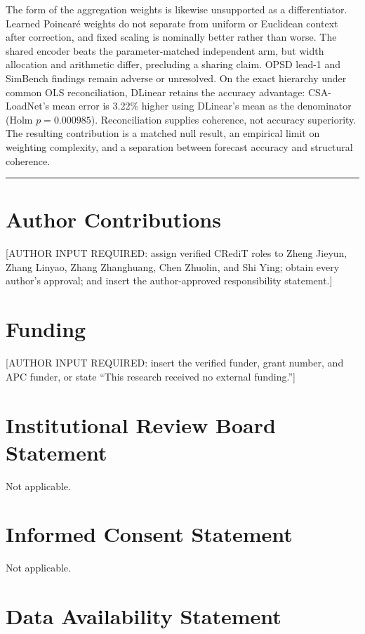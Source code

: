 \documentclass[electronics,article,submit,moreauthors]{Definitions/mdpi}
\begin{document}
The form of the aggregation weights is likewise unsupported as a differentiator. Learned Poincar\'{e} weights do not separate from uniform or Euclidean context after correction, and fixed scaling is nominally better rather than worse. The shared encoder beats the parameter-matched independent arm, but width allocation and arithmetic differ, precluding a sharing claim. OPSD lead-1 and SimBench findings remain adverse or unresolved. On the exact hierarchy under common OLS reconciliation, DLinear retains the accuracy advantage: CSA-LoadNet's mean error is 3.22\% higher using DLinear's mean as the denominator (Holm \(p=0.000985\)). Reconciliation supplies coherence, not accuracy superiority. The resulting contribution is a matched null result, an empirical limit on weighting complexity, and a separation between forecast accuracy and structural coherence.

\begin{center}\rule{0.5\linewidth}{0.5pt}\end{center}

\section*{Author Contributions}

{[}AUTHOR INPUT REQUIRED: assign verified CRediT roles to Zheng Jieyun, Zhang Linyao, Zhang Zhanghuang, Chen Zhuolin, and Shi Ying; obtain every author's approval; and insert the author-approved responsibility statement.{]}

\section*{Funding}

{[}AUTHOR INPUT REQUIRED: insert the verified funder, grant number, and APC funder, or state ``This research received no external funding.''{]}

\section*{Institutional Review Board Statement}

Not applicable.

\section*{Informed Consent Statement}

Not applicable.

\section*{Data Availability Statement}
\end{document}
